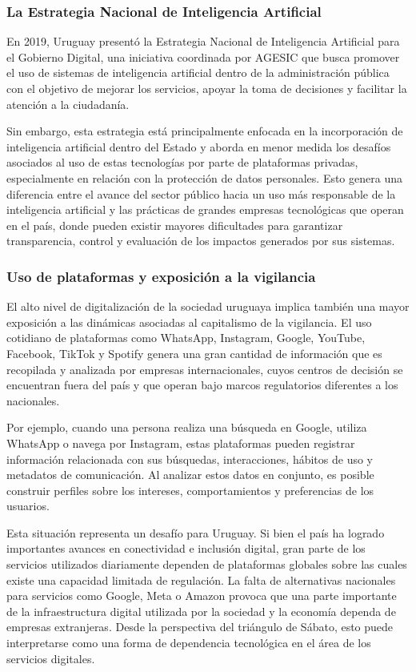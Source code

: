 \documentclass[11pt,a4paper]{article}
\begin{document}
\subsubsection{La Estrategia Nacional de Inteligencia Artificial}

En 2019, Uruguay presentó la Estrategia Nacional de Inteligencia Artificial para el Gobierno Digital, una iniciativa coordinada por AGESIC que busca promover el uso de sistemas de inteligencia artificial dentro de la administración pública con el objetivo de mejorar los servicios, apoyar la toma de decisiones y facilitar la atención a la ciudadanía.

Sin embargo, esta estrategia está principalmente enfocada en la incorporación de inteligencia artificial dentro del Estado y aborda en menor medida los desafíos asociados al uso de estas tecnologías por parte de plataformas privadas, especialmente en relación con la protección de datos personales. Esto genera una diferencia entre el avance del sector público hacia un uso más responsable de la inteligencia artificial y las prácticas de grandes empresas tecnológicas que operan en el país, donde pueden existir mayores dificultades para garantizar transparencia, control y evaluación de los impactos generados por sus sistemas.

\subsubsection{Uso de plataformas y exposición a la vigilancia}

El alto nivel de digitalización de la sociedad uruguaya implica también una mayor exposición a las dinámicas asociadas al capitalismo de la vigilancia. El uso cotidiano de plataformas como WhatsApp, Instagram, Google, YouTube, Facebook, TikTok y Spotify genera una gran cantidad de información que es recopilada y analizada por empresas internacionales, cuyos centros de decisión se encuentran fuera del país y que operan bajo marcos regulatorios diferentes a los nacionales.

Por ejemplo, cuando una persona realiza una búsqueda en Google, utiliza WhatsApp o navega por Instagram, estas plataformas pueden registrar información relacionada con sus búsquedas, interacciones, hábitos de uso y metadatos de comunicación. Al analizar estos datos en conjunto, es posible construir perfiles sobre los intereses, comportamientos y preferencias de los usuarios.

Esta situación representa un desafío para Uruguay. Si bien el país ha logrado importantes avances en conectividad e inclusión digital, gran parte de los servicios utilizados diariamente dependen de plataformas globales sobre las cuales existe una capacidad limitada de regulación. La falta de alternativas nacionales para servicios como Google, Meta o Amazon provoca que una parte importante de la infraestructura digital utilizada por la sociedad y la economía dependa de empresas extranjeras. Desde la perspectiva del triángulo de Sábato, esto puede interpretarse como una forma de dependencia tecnológica en el área de los servicios digitales.
\end{document}

